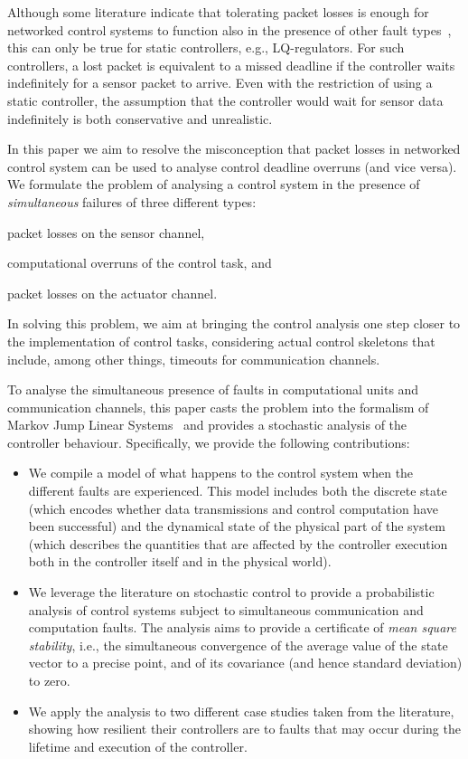 Although some literature indicate that tolerating packet losses is enough for networked control systems to function also in the presence of other fault types~\cite{Kauer:2014, Ghosh:2018, Horssen:2016, Ling:2002, Linsenmayer:2017}, this can only be true for static controllers, e.g., LQ-regulators.
For such controllers, a lost packet is equivalent to a missed deadline if the controller waits indefinitely for a sensor packet to arrive.
Even with the restriction of using a static controller, the assumption that the controller would wait for sensor data indefinitely is both conservative and unrealistic.

In this paper we aim to resolve the misconception that packet losses in networked control system can be used to analyse control deadline overruns (and vice versa).
We formulate the problem of analysing a control system in the presence of \emph{simultaneous} failures of three different types:
\begin{enumerate*}[label=(\roman*)]
    \item packet losses on the sensor channel,
    \item computational overruns of the control task, and
    \item packet losses on the actuator channel.
\end{enumerate*}
In solving this problem, we aim at bringing the control analysis one step closer to the implementation of control tasks, considering actual control skeletons that include, among other things, timeouts for communication channels.

To analyse the simultaneous presence of faults in computational units and communication channels, this paper casts the problem into the formalism of Markov Jump Linear Systems~\cite{Costa:2005} and provides a stochastic analysis of the controller behaviour.
Specifically, we provide the following contributions:
\begin{itemize}[itemsep=0mm]
    \item We compile a model of what happens to the control system when the different faults are experienced. This model includes both the discrete state (which encodes whether data transmissions and control computation have been successful) and the dynamical state of the physical part of the system (which describes the quantities that are affected by the controller execution both in the controller itself and in the physical world).
    \item We leverage the literature on stochastic control to provide a probabilistic analysis of control systems subject to simultaneous communication and computation faults. The analysis aims to provide a certificate of \emph{mean square stability}, i.e., the simultaneous convergence of the average value of the state vector to a precise point, and of its covariance (and hence standard deviation) to zero.
    \item We apply the analysis to two different case studies taken from the literature, showing how resilient their controllers are to faults that may occur during the lifetime and execution of the controller.
\end{itemize}

